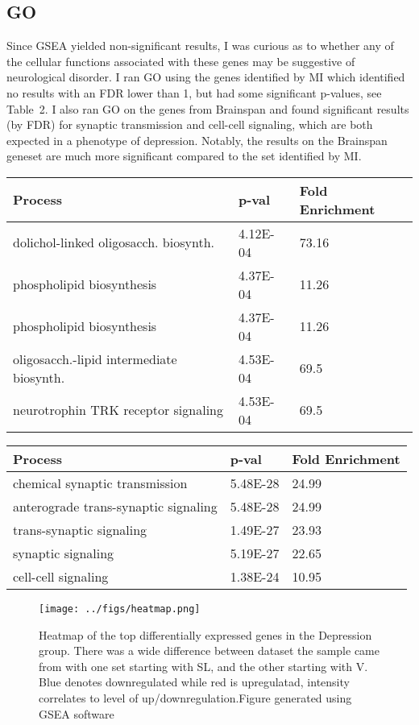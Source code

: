 \documentclass{bioinfo}
\begin{document}
\subsection{GO}
Since GSEA yielded non-significant results, I was curious as to whether any of the cellular functions associated with these genes may be suggestive of neurological disorder.  I ran GO using the genes identified by MI which identified no results with an FDR lower than 1, but had some significant p-values, see Table~2\vphantom{\ref{Tab:02}}.  I also ran GO on the genes from Brainspan and found significant results (by FDR) for synaptic transmission and cell-cell signaling, which are
both expected in a phenotype of depression.  Notably, the results on the Brainspan geneset are much more significant compared to the set identified by MI.
\begin{table}[!t]
     {\begin{tabular}{@{}lll@{}}
Process&	p-val&	Fold Enrichment\\\hline
dolichol-linked oligosacch. biosynth. & 4.12E-04& 73.16\\
phospholipid biosynthesis & 4.37E-04& 11.26\\
phospholipid biosynthesis & 4.37E-04& 11.26\\
oligosacch.-lipid intermediate biosynth. & 4.53E-04 & 69.5 \\
neurotrophin TRK receptor signaling & 4.53E-04 & 69.5 \\
\end{tabular}}{}
\end{table}
\begin{table}[!t]
     {\begin{tabular}{@{}lll@{}}
Process&	p-val&	Fold Enrichment\\\hline
chemical synaptic transmission & 	5.48E-28 & 24.99 \\
anterograde trans-synaptic signaling&  	5.48E-28 & 24.99 \\
trans-synaptic signaling&  	1.49E-27& 23.93 \\
synaptic signaling & 	5.19E-27 & 22.65\\
cell-cell signaling &  	1.38E-24& 10.95 \\
\end{tabular}}{}
\end{table}
\begin{figure*}[tbp!]%
    \centering
    \texttt{[image: ../figs/heatmap.png]}
    \caption{Heatmap of the top differentially expressed genes in the Depression group.  There was a wide difference between dataset the sample came from with one set starting with SL, and the other starting with V. Blue denotes downregulated while red is upregulatad, intensity correlates to level of up/downregulation.Figure generated using GSEA software \citep{Subramanian}}\label{fig:04}
\end{figure*}
\end{document}
